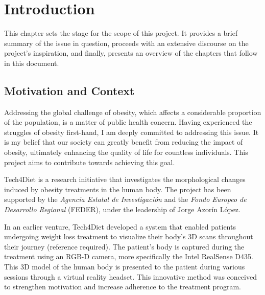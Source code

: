 \chapter{Introduction}\label{chap:introduction}

This chapter sets the stage for the scope of this project. It provides a brief
summary of the issue in question, proceeds with an extensive discourse on the
project's inspiration, and finally, presents an overview of the chapters that
follow in this document.

\section{Motivation and Context}

Addressing the global challenge of obesity, which affects a considerable
proportion of the population, is a matter of public health concern. Having
experienced the struggles of obesity first-hand, I am deeply committed to
addressing this issue. It is my belief that our society can greatly benefit
from reducing the impact of obesity, ultimately enhancing the quality of life
for countless individuals. This project aims to contribute towards achieving
this goal.

Tech4Diet is a research initiative that investigates the morphological changes
induced by obesity treatments in the human body. The project has been supported
by the \textit{Agencia Estatal de Investigación} and the \textit{Fondo Europeo
	de Desarrollo Regional} (FEDER), under the leadership of Jorge Azorín López.

In an earlier venture, Tech4Diet developed a system that enabled patients
undergoing weight loss treatment to visualize their body's 3D scans throughout
their journey (reference required). The patient's body is captured during the
treatment using an RGB-D camera, more specifically the Intel RealSense D435.
This 3D model of the human body is presented to the patient during various
sessions through a virtual reality headset. This innovative method was
conceived to strengthen motivation and increase adherence to the treatment
program.

